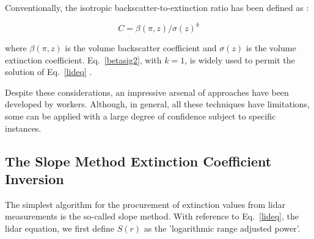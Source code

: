 Conventionally, the isotropic backscatter-to-extinction 
ratio has been defined as \cite{cmrpjcsacd}:

\begin{equation}
C=\beta(\pi,z)/{\sigma(z)^{k}}
\label{betasig2}
\end{equation}

\noindent
where $\beta(\pi,z)$ is the volume backscatter
coefficient and $\sigma(z)$ is the volume extinction coefficient. 
Eq.~{\ref{betasig2}}, with $k=1$, is widely used to permit the solution
of Eq.~{\ref{lideq}} \cite{jdk1}.

Despite these considerations, an impressive
arsenal of approaches have been developed by 
workers. Although, in general, all these techniques have limitations, 
some can be applied with a large degree of confidence subject to specific 
instances. 
 
\subsection{The Slope Method Extinction Coefficient Inversion}

The simplest algorithm for the procurement of
extinction values from lidar measurements is the
so-called slope method. With reference to Eq.~{\ref{lideq}},
the lidar equation, we first define $S(r)$ as the 
'logarithmic range adjusted power'.

